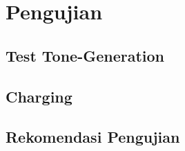 \documentclass[12pt]{book}
\begin{document}
    \chapter{Pengujian}

    \section{Test Tone-Generation}

    \section{Charging}

    \section{Rekomendasi Pengujian}
\end{document}
